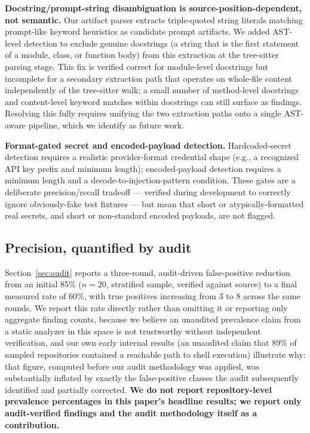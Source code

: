 \documentclass[sigconf,anonymous,review]{acmart}
\begin{document}
\textbf{Docstring/prompt-string disambiguation is source-position-dependent, not semantic.} Our artifact parser extracts triple-quoted string literals matching prompt-like keyword heuristics as candidate prompt artifacts. We added AST-level detection to exclude genuine docstrings (a string that is the first statement of a module, class, or function body) from this extraction at the tree-sitter parsing stage. This fix is verified correct for module-level docstrings but incomplete for a secondary extraction path that operates on whole-file content independently of the tree-sitter walk; a small number of method-level docstrings and content-level keyword matches within docstrings can still surface as findings. Resolving this fully requires unifying the two extraction paths onto a single AST-aware pipeline, which we identify as future work.

\textbf{Format-gated secret and encoded-payload detection.} Hardcoded-secret detection requires a realistic provider-format credential shape (e.g., a recognized API key prefix and minimum length); encoded-payload detection requires a minimum length and a decode-to-injection-pattern condition. These gates are a deliberate precision/recall tradeoff --- verified during development to correctly ignore obviously-fake test fixtures --- but mean that short or atypically-formatted real secrets, and short or non-standard encoded payloads, are not flagged.

\subsection{Precision, quantified by audit}
\label{sec:precision}
Section~\ref{sec:audit} reports a three-round, audit-driven false-positive reduction from an initial 85\% ($n{=}20$, stratified sample, verified against source) to a final measured rate of 60\%, with true positives increasing from 3 to 8 across the same rounds. We report this rate directly rather than omitting it or reporting only aggregate finding counts, because we believe an unaudited prevalence claim from a static analyzer in this space is not trustworthy without independent verification, and our own early internal results (an unaudited claim that 89\% of sampled repositories contained a reachable path to shell execution) illustrate why: that figure, computed before our audit methodology was applied, was substantially inflated by exactly the false-positive classes the audit subsequently identified and partially corrected. \textbf{We do not report repository-level prevalence percentages in this paper's headline results; we report only audit-verified findings and the audit methodology itself as a contribution.}
\end{document}

